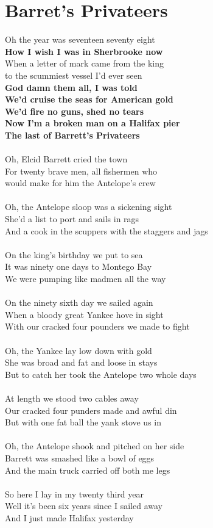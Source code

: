 \documentclass[letterpaper,9pt]{article}
\begin{document}
\section{Barret's Privateers}
\large
\noindent
Oh the year was seventeen seventy eight
\\\textbf{How I wish I was in Sherbrooke now}
\\When a letter of mark came from the king
\\to the scummiest vessel I'd ever seen
\\\textbf{God damn them all, I was told
\\We'd cruise the seas for American gold
\\We'd fire no guns, shed no tears
\\Now I'm a broken man on a Halifax pier
\\The last of Barrett's Privateers}
\\
\\Oh, Elcid Barrett cried the town
\\For twenty brave men, all fishermen who
\\would make for him the Antelope's crew
\\
\\Oh, the Antelope sloop was a sickening sight
\\She'd a list to port and sails in rags
\\And a cook in the scuppers with the staggers and jags
\\
\\On the king's birthday we put to sea
\\It was ninety one days to Montego Bay
\\We were pumping like madmen all the way
\\
\\On the ninety sixth day we sailed again
\\When a bloody great Yankee hove in sight
\\With our cracked four pounders we made to fight
\\
\\Oh, the Yankee lay low down with gold
\\She was broad and fat and loose in stays
\\But to catch her took the Antelope two whole days
\\
\\At length we stood two cables away
\\Our cracked four punders made and awful din
\\But with one fat ball the yank stove us in
\\
\\Oh, the Antelope shook and pitched on her side
\\Barrett was smashed like a bowl of eggs
\\And the main truck carried off both me legs
\\
\\So here I lay in my twenty third year
\\Well it's been six years since I sailed away
\\And I just made Halifax yesterday
\end{document}
